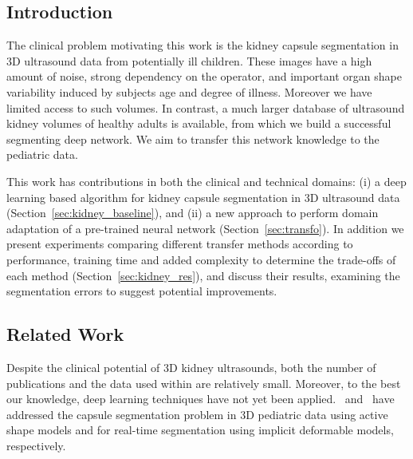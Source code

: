 \subsection{Introduction}


The clinical problem motivating this work is the kidney capsule segmentation in 3D ultrasound data from potentially ill children. These images have a high amount of noise, strong dependency on the operator, and important organ shape variability induced by subjects age and degree of illness. Moreover we have limited access to such volumes. In contrast, a much larger database of ultrasound kidney volumes of healthy adults is available, from which we build a successful segmenting deep network. We aim to transfer this network knowledge to the pediatric data. 

This work has contributions in both the clinical and technical domains: (i) a deep learning based algorithm for kidney capsule segmentation in 3D ultrasound data (Section~\ref{sec:kidney_baseline}), and (ii) a new approach to perform domain adaptation of a pre-trained neural network (Section~\ref{sec:transfo}). In addition we present experiments comparing different transfer methods according to performance, training time and added complexity to determine the trade-offs of each method (Section~\ref{sec:kidney_res}), and discuss their results, examining the segmentation errors to suggest potential improvements.

\subsection{Related Work}


Despite the clinical potential of 3D kidney ultrasounds, both the number of publications and the data used within are relatively small. Moreover, to the best our knowledge, deep learning techniques have not yet been applied.~\textcite{cerrolaza2014ISBI} and~\textcite{marsousi2017} have addressed the capsule segmentation problem in 3D pediatric data using active shape models and for real-time segmentation using implicit deformable models, respectively. 

